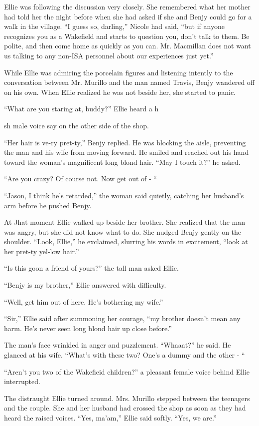 \documentclass[]{article}
\begin{document}
{Ellie was following the discussion very closely.  She remembered what her mother had told her the night before when she had asked if she and Benjy could go for a walk in the village.  “I guess so, darling,” Nicole had said, “but if anyone recognizes you as a Wakefield and starts to question you, don’t talk to them.  Be polite, and then come home as quickly as you can.  Mr.  Macmillan does not want us talking to any non-ISA personnel about our experiences just yet.”

While Ellie was admiring the porcelain figures and listening intently to the conversation between Mr.  Murillo and the man named Travis, Benjy wandered off on his own.  When Ellie realized he was not beside her, she started to panic.

“What are you staring at, buddy?” Ellie heard a h

sh male voice say on the other side of the shop.

“Her hair is ve-ry pret-ty,” Benjy replied.  He was blocking the aisle, preventing the man and his wife from moving forward.  He smiled and reached out his hand toward the woman’s magnificent long blond hair.  “May I touch it?” he asked.

“Are you crazy? Of course not.  Now get out of - “

“Jason, I think he’s retarded,” the woman said quietly, catching her husband’s arm before he pushed Benjy.

At Jhat moment Ellie walked up beside her brother.  She realized that the man was angry, but she did not know what to do.  She nudged Benjy gently on the shoulder.  “Look, Ellie,” he exclaimed, slurring his words in excitement, “look at her pret-ty yel-low hair.”

“Is this goon a friend of yours?” the tall man asked Ellie.

“Benjy is my brother,” Ellie answered with difficulty.

“Well, get him out of here.  He’s bothering my wife.”

“Sir,” Ellie said after summoning her courage, “my brother doesn’t mean any harm.  He’s never seen long blond hair up close before.”

The man’s face wrinkled in anger and puzzlement.  “Whaaat?” he said.  He glanced at his wife.  “What’s with these two? One’s a dummy and the other - “

“Aren’t you two of the Wakefieid children?” a pleasant female voice behind Ellie interrupted.

The distraught Ellie turned around.  Mrs.  Murillo stepped between the teenagers and the couple.  She and her husband had crossed the shop as soon as they had heard the raised voices.  “Yes, ma’am,” Ellie said softly.  “Yes, we are.”

}
\end{document}
